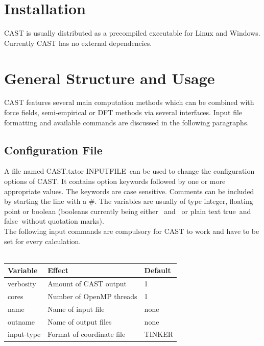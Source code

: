 \documentclass[10pt,a4paper]{article} %
\newif\ifdevelopment %
\begin{document}
	\section{Installation}
	\ac{CAST} is usually distributed as a precompiled executable for Linux and Windows. Currently \ac{CAST} has no external dependencies.

	\ifdevelopment
		The Windows binary can be used with any Windows operating system starting from Windows 7. No further requirements exist. On Linux,
		precompiled binaries are statically linked. FFTW 3.4 libraries have to be set in the \textit{PATH} variable of the Linux shell:\\
		\textbf{LD\_LIBRARY\_PATH \glqq Path to FFTW lib dir\grqq}
	\fi
	\newpage

	\section{General Structure and Usage}
	\ac{CAST} features several main computation methods which can be combined with force fields, semi-empirical or \ac{DFT} methods via several interfaces. Input file formatting and available commands are discussed in the following paragraphs.


	\subsection{Configuration File}
	A file named \glqq CAST.txt\grqq or \glqq INPUTFILE\grqq~can be used to change the configuration options of \ac{CAST}. It contains option keywords followed by one or more appropriate values. The keywords are case sensitive. Comments can be included by starting the line with a \glqq \#\grqq. The variables are usually of type integer, floating point or boolean (booleans currently being either \grqq~and \grqq~or plain text \glqq true\grqq~and \glqq false\grqq~without quotation marks).\\

	The following input commands are compulsory for \ac{CAST} to work and have to be set for every calculation.\\~\\
	\begin{tabularx}{\textwidth}{l|l|l}
		Variable&	Effect &	Default \\
		\hline
		verbosity &	Amount of \ac{CAST} output &	1\\
		cores &	Number of OpenMP threads &	1\\
		name &	Name of input file &	none\\
		outname &	Name of output files &	none\\
		input-type &	Format of coordinate file &	TINKER\\
	\end{tabularx}\\~\\
\end{document}
